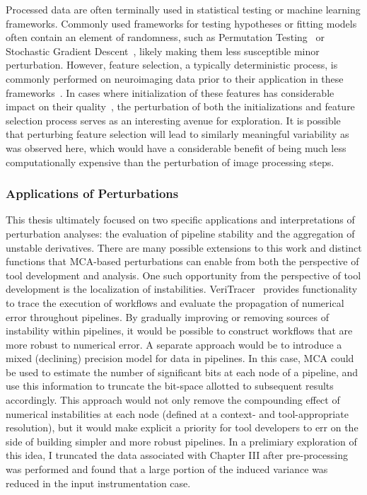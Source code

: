 Processed data are often terminally used in statistical testing or machine learning frameworks. Commonly used
frameworks for testing hypotheses or fitting models often contain an element of randomness, such as Permutation
Testing~\cite{oden1975arguments} or Stochastic Gradient Descent~\cite{bottou1991stochastic}, likely making them less
susceptible minor perturbation. However, feature selection, a typically deterministic process, is commonly performed
on neuroimaging data prior to their application in these frameworks~\cite{mwangi2014review}. In cases where
initialization of these features has considerable impact on their quality~\cite{kobak2021init}, the perturbation of
both the initializations and feature selection process serves as an interesting avenue for exploration. It is possible
that perturbing feature selection will lead to similarly meaningful variability as was observed here, which would
have a considerable benefit of being much less computationally expensive than the perturbation of image processing
steps.

\subsubsection{Applications of Perturbations}

This thesis ultimately focused on two specific applications and interpretations of perturbation analyses: the
evaluation of pipeline stability and the aggregation of unstable derivatives. There are many possible extensions to
this work and distinct functions that MCA-based perturbations can enable from both the perspective of tool
development and analysis. One such opportunity from the perspective of tool development is the localization of
instabilities. VeriTracer~\cite{chatelain2018veritracer} provides functionality to trace the execution of
workflows and evaluate the propagation of numerical error throughout pipelines. By gradually improving or
removing sources of instability within pipelines, it would be possible to construct workflows that are more
robust to numerical error. A separate approach would be to introduce a mixed (declining) precision model for
data in pipelines. In this case, MCA could be used to estimate the number of significant bits at each node of
a pipeline, and use this information to truncate the bit-space allotted to subsequent results accordingly. This
approach would not only remove the compounding effect of numerical instabilities at each node (defined at a
context- and tool-appropriate resolution), but it would make explicit a priority for tool developers to err on
the side of building simpler and more robust pipelines. In a prelimiary exploration of this idea, I truncated the
data associated with Chapter III after pre-processing was performed and found that a large portion of the induced
variance was reduced in the input instrumentation case.

